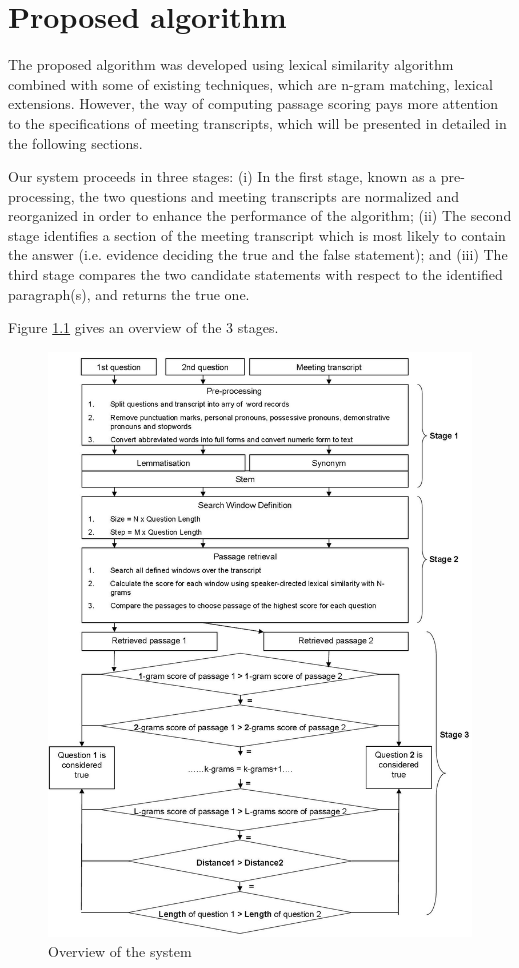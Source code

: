 \chapter{Proposed algorithm}


The proposed algorithm was developed using lexical similarity algorithm combined with some of existing techniques, which are n-gram matching, lexical extensions. However, the way of computing passage scoring pays more attention to the specifications of meeting transcripts, which will be presented in detailed in the following sections.

Our system proceeds in three stages: (i) In the first stage, known as a pre-processing, the two questions and meeting transcripts are normalized and reorganized in order to enhance the performance of the algorithm; (ii) The second stage identifies a section of the meeting transcript which is most likely to contain the answer (i.e. evidence deciding the true and the false statement); and (iii) The third stage compares the two candidate statements with respect to the identified paragraph(s), and returns the true one. 


Figure \ref{SystemOverview} gives an overview of the 3 stages.

\begin{figure}[htbp]
\centering
\includegraphics[scale = 0.6]{Stages_of_system.jpg}
\caption{Overview of the system}\label{SystemOverview}
\end{figure}


